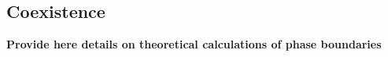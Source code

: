 \documentclass[journal=jacsat,manuscript=article]{achemso}
\begin{document}









\subsection{Coexistence}

{\bf Provide here details on theoretical calculations of phase boundaries}
\end{document}
